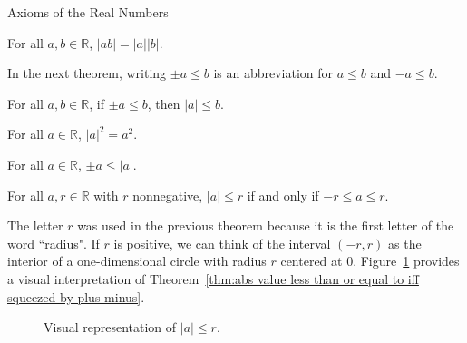 \begin{section}{Axioms of the Real Numbers}
\begin{theorem}
For all $a,b\in\mathbb{R}$, $|ab|=|a||b|$.
\end{theorem}

In the next theorem, writing $\pm a\leq b$ is an abbreviation for $a\leq b$ and $-a\leq b$.

\begin{theorem}
For all $a,b\in\mathbb{R}$, if $\pm a\leq b$, then $|a|\leq b$. 
\end{theorem}

\begin{theorem}
For all $a\in\mathbb{R}$, $|a|^2=a^2$.
\end{theorem}

\begin{theorem}\label{thm:plus minus less than or equal to abs value}
For all $a\in\mathbb{R}$, $\pm a\leq |a|$.
\end{theorem}

\begin{theorem}\label{thm:abs value less than or equal to iff squeezed by plus minus}
For all $a,r\in\mathbb{R}$ with $r$ nonnegative, $|a|\leq r$ if and only if $-r\leq a\leq r$.
\end{theorem}

The letter $r$ was used in the previous theorem because it is the first letter of the word ``radius". If $r$ is positive, we can think of the interval $(-r,r)$ as the interior of a one-dimensional circle with radius $r$ centered at 0. Figure~\ref{fig:abs value less than or equal to iff squeezed by plus minus} provides a visual interpretation of Theorem~\ref{thm:abs value less than or equal to iff squeezed by plus minus}.

\begin{figure}[h!]
\centering
{}
\caption{Visual representation of $|a|\leq r$.}\label{fig:abs value less than or equal to iff squeezed by plus minus}
\end{figure}


\end{section}
